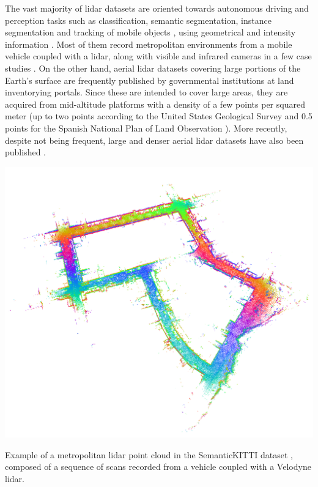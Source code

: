 The vast majority of \acrshort{lidar} datasets are oriented towards autonomous driving and perception tasks such as classification, semantic segmentation, instance segmentation and tracking of mobile objects \cite{chen_automatic_2022}, using geometrical \cite{behley_towards_2021} and intensity information \cite{tan_toronto-3d_2020}. Most of them record metropolitan environments from a mobile vehicle coupled with a \acrshort{lidar}, along with visible and infrared cameras in a few case studies \cite{choi_kaist_2018}. On the other hand, aerial \acrshort{lidar} datasets covering large portions of the Earth's surface are frequently published by governmental institutions at land inventorying portals. Since these are intended to cover large areas, they are acquired from mid-altitude platforms with a density of a few points per squared meter (up to two points according to the United States Geological Survey \cite{us_geological_survey_lidar_2012} and 0.5 points for the Spanish National Plan of Land Observation \cite{instituto_geografico_de_informacion_geografica_pnoa_nodate}). More recently, despite not being frequent, large and denser aerial \acrshort{lidar} datasets have also been published \cite{varney_dales_2020}. 
\begin{marginfigure}[.0cm]
	\includegraphics{figs/context/kitty_scan.png}
	\caption{Example of a metropolitan \acrshort{lidar} point cloud in the SemanticKITTI dataset \cite{behley_towards_2021}, composed of a sequence of scans recorded from a vehicle coupled with a Velodyne \acrshort{lidar}.}
	\label{fig:kitty_scan}
\end{marginfigure}

